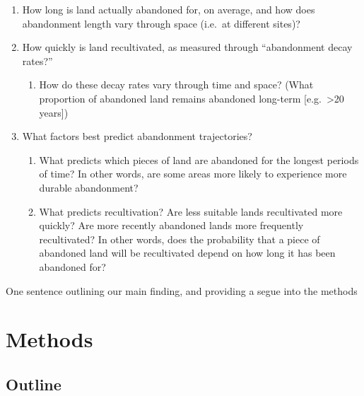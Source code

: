 \documentclass[
]{article}
\providecommand{\tightlist}{%
  \setlength{\itemsep}{0pt}\setlength{\parskip}{0pt}}
\begin{document}
\begin{enumerate}
\def\labelenumi{\arabic{enumi}.}
\tightlist
\item
  How long is land actually abandoned for, on average, and how does abandonment length vary through space (i.e.~at different sites)?
\item
  How quickly is land recultivated, as measured through ``abandonment decay rates?''

  \begin{enumerate}
  \def\labelenumii{\alph{enumii}.}
  \tightlist
  \item
    How do these decay rates vary through time and space? (What proportion of abandoned land remains abandoned long-term {[}e.g.~\textgreater20 years{]})
  \end{enumerate}
\item
  What factors best predict abandonment trajectories?

  \begin{enumerate}
  \def\labelenumii{\alph{enumii}.}
  \tightlist
  \item
    What predicts which pieces of land are abandoned for the longest periods of time? In other words, are some areas more likely to experience more durable abandonment?
  \item
    What predicts recultivation? Are less suitable lands recultivated more quickly? Are more recently abandoned lands more frequently recultivated? In other words, does the probability that a piece of abandoned land will be recultivated depend on how long it has been abandoned for?
  \end{enumerate}
\end{enumerate}

One sentence outlining our main finding, and providing a segue into the methods

\hypertarget{methods}{%
\section{Methods}\label{methods}}

\hypertarget{outline}{%
\subsection{Outline}\label{outline}}
\end{document}
